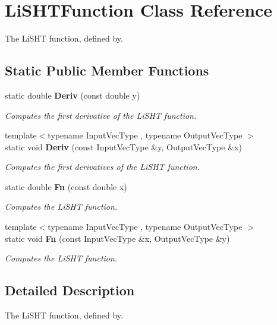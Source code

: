\section{Li\+S\+H\+T\+Function Class Reference}
\label{classmlpack_1_1ann_1_1LiSHTFunction}


The Li\+S\+HT function, defined by.  


\subsection*{Static Public Member Functions}
\begin{DoxyCompactItemize}
\item 
static double \textbf{ Deriv} (const double y)
\begin{DoxyCompactList}\small\item\em Computes the first derivative of the Li\+S\+HT function. \end{DoxyCompactList}\item 
{\footnotesize template$<$typename Input\+Vec\+Type , typename Output\+Vec\+Type $>$ }\\static void \textbf{ Deriv} (const Input\+Vec\+Type \&y, Output\+Vec\+Type \&x)
\begin{DoxyCompactList}\small\item\em Computes the first derivatives of the Li\+S\+HT function. \end{DoxyCompactList}\item 
static double \textbf{ Fn} (const double x)
\begin{DoxyCompactList}\small\item\em Computes the Li\+S\+HT function. \end{DoxyCompactList}\item 
{\footnotesize template$<$typename Input\+Vec\+Type , typename Output\+Vec\+Type $>$ }\\static void \textbf{ Fn} (const Input\+Vec\+Type \&x, Output\+Vec\+Type \&y)
\begin{DoxyCompactList}\small\item\em Computes the Li\+S\+HT function. \end{DoxyCompactList}\end{DoxyCompactItemize}


\subsection{Detailed Description}
The Li\+S\+HT function, defined by. 

